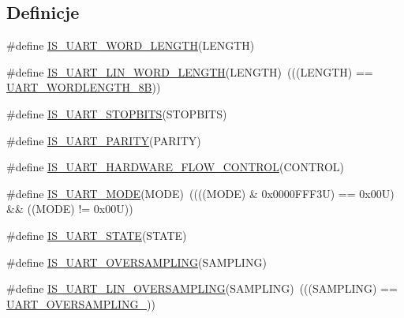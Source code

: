 \subsection*{Definicje}
\begin{DoxyCompactItemize}
\item 
\#define \hyperlink{group___u_a_r_t___private___macros_ga4fb6c975f14bd141ec282820823a2fff}{I\+S\+\_\+\+U\+A\+R\+T\+\_\+\+W\+O\+R\+D\+\_\+\+L\+E\+N\+G\+TH}(L\+E\+N\+G\+TH)
\item 
\#define \hyperlink{group___u_a_r_t___private___macros_ga12e732e82119829947fb0c97da82bd69}{I\+S\+\_\+\+U\+A\+R\+T\+\_\+\+L\+I\+N\+\_\+\+W\+O\+R\+D\+\_\+\+L\+E\+N\+G\+TH}(L\+E\+N\+G\+TH)~(((L\+E\+N\+G\+TH) == \hyperlink{group___u_a_r_t___word___length_gaf394e9abaf17932ee89591f990fe6407}{U\+A\+R\+T\+\_\+\+W\+O\+R\+D\+L\+E\+N\+G\+T\+H\+\_\+8B}))
\item 
\#define \hyperlink{group___u_a_r_t___private___macros_ga2c61795ef4affdddf3854c8f59568e41}{I\+S\+\_\+\+U\+A\+R\+T\+\_\+\+S\+T\+O\+P\+B\+I\+TS}(S\+T\+O\+P\+B\+I\+TS)
\item 
\#define \hyperlink{group___u_a_r_t___private___macros_gaf2f542d273738ee3cb4a93d169827744}{I\+S\+\_\+\+U\+A\+R\+T\+\_\+\+P\+A\+R\+I\+TY}(P\+A\+R\+I\+TY)
\item 
\#define \hyperlink{group___u_a_r_t___private___macros_ga4da792d3bbb8e04d97dd45b963ac2464}{I\+S\+\_\+\+U\+A\+R\+T\+\_\+\+H\+A\+R\+D\+W\+A\+R\+E\+\_\+\+F\+L\+O\+W\+\_\+\+C\+O\+N\+T\+R\+OL}(C\+O\+N\+T\+R\+OL)
\item 
\#define \hyperlink{group___u_a_r_t___private___macros_ga748d45fbdc96c743bee170b749f961ba}{I\+S\+\_\+\+U\+A\+R\+T\+\_\+\+M\+O\+DE}(M\+O\+DE)~((((M\+O\+DE) \& 0x0000\+F\+F\+F3\+U) == 0x00\+U) \&\& ((\+M\+O\+D\+E) != 0x00\+U))
\item 
\#define \hyperlink{group___u_a_r_t___private___macros_ga202315393e18f29b20eb49ad9f8934dd}{I\+S\+\_\+\+U\+A\+R\+T\+\_\+\+S\+T\+A\+TE}(S\+T\+A\+TE)
\item 
\#define \hyperlink{group___u_a_r_t___private___macros_ga8486e4a622ab62a11d82389d4aa0305d}{I\+S\+\_\+\+U\+A\+R\+T\+\_\+\+O\+V\+E\+R\+S\+A\+M\+P\+L\+I\+NG}(S\+A\+M\+P\+L\+I\+NG)
\item 
\#define \hyperlink{group___u_a_r_t___private___macros_gacd5577cca731f8ef51badd665f6aa5e6}{I\+S\+\_\+\+U\+A\+R\+T\+\_\+\+L\+I\+N\+\_\+\+O\+V\+E\+R\+S\+A\+M\+P\+L\+I\+NG}(S\+A\+M\+P\+L\+I\+NG)~(((S\+A\+M\+P\+L\+I\+NG) == \hyperlink{group___u_a_r_t___over___sampling_gaa6a320ec65d248d76f21de818db1a2f0}{U\+A\+R\+T\+\_\+\+O\+V\+E\+R\+S\+A\+M\+P\+L\+I\+N\+G\+\_}))

\end{DoxyCompactItemize}
